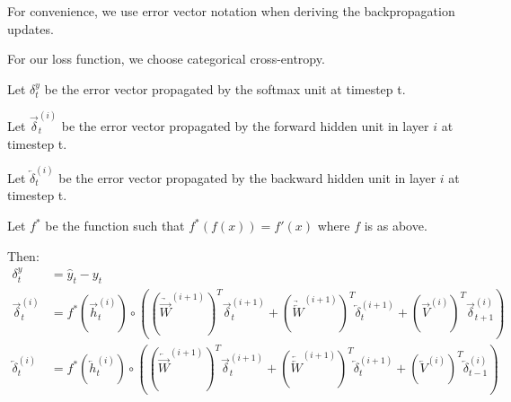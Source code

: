 \documentclass[12pt]{article}
\begin{document}
    For convenience, we use error vector notation when deriving the backpropagation updates.

    For our loss function, we choose categorical cross-entropy.

    Let $\delta_t^y$ be the error vector propagated by the softmax unit at timestep t.

    Let $\overrightarrow{\delta}_t^{(i)}$ be the error vector propagated by the 
    forward hidden unit in layer $i$ at timestep t.

    Let $\overleftarrow{\delta}_t^{(i)}$ be the error vector propagated by the 
    backward hidden unit in layer $i$ at timestep t.

    Let $f^*$ be the function such that $f^* (f(x)) = f'(x)$ where $f$ is as above.

    Then:
    \begin{align}
      \delta_t^y &= \hat{y}_t - y_t \\
      \overrightarrow{\delta}_t^{(i)} &= f^* (\overrightarrow{h}_t^{(i)}) \circ ((\underrightarrow{\overrightarrow{W}}^{(i+1)})^T \overrightarrow{\delta}_t^{(i+1)} + (\underrightarrow{\overleftarrow{W}}^{(i+1)})^T \overleftarrow{\delta}_t^{(i+1)} + (\overrightarrow{V}^{(i)})^T \overrightarrow{\delta}_{t+1}^{(i)}) \\
      \overleftarrow{\delta}_t^{(i)} &= f^* (\overleftarrow{h}_t^{(i)}) \circ ((\underleftarrow{\overrightarrow{W}}^{(i+1)})^T \overrightarrow{\delta}_t^{(i+1)} + (\underleftarrow{\overleftarrow{W}}^{(i+1)})^T \overleftarrow{\delta}_t^{(i+1)} + (\overleftarrow{V}^{(i)})^T \overleftarrow{\delta}_{t-1}^{(i)})
    \end{align}
\end{document}
